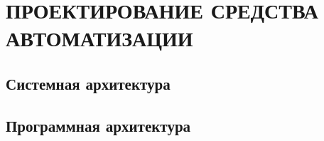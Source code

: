\section{\large{ПРОЕКТИРОВАНИЕ СРЕДСТВА АВТОМАТИЗАЦИИ}}



\subsection{\large{Системная архитектура}}







\subsection{\large{Программная архитектура}}



%
%
%